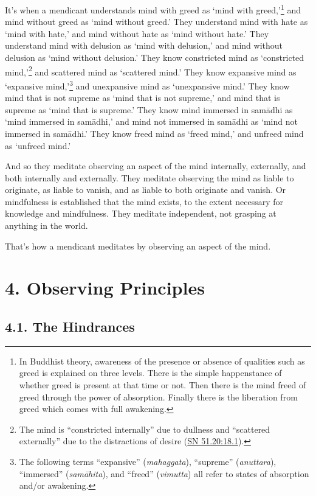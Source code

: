 \documentclass[12pt,openany]{book}%
\begin{document}
It’s when a mendicant understands mind with greed as ‘mind with greed,’\footnote{In Buddhist theory, awareness of the presence or absence of qualities such as greed is explained on three levels. There is the simple happenstance of whether greed is present at that time or not. Then there is the mind freed of greed through the power of absorption. Finally there is the liberation from greed which comes with full awakening. } and mind without greed as ‘mind without greed.’ They understand mind with hate as ‘mind with hate,’ and mind without hate as ‘mind without hate.’ They understand mind with delusion as ‘mind with delusion,’ and mind without delusion as ‘mind without delusion.’ They know constricted mind as ‘constricted mind,’\footnote{The mind is “constricted internally” due to dullness and “scattered externally” due to the distractions of desire (\href{https://suttacentral.net/sn51.20/en/sujato\#18.1}{SN 51.20:18.1}). } and scattered mind as ‘scattered mind.’ They know expansive mind as ‘expansive mind,’\footnote{The following terms “expansive” (\textit{mahaggata}), “supreme” (\textit{anuttara}), “immersed” (\textit{\textsanskrit{samāhita}}), and “freed” (\textit{vimutta}) all refer to states of absorption and/or awakening. } and unexpansive mind as ‘unexpansive mind.’ They know mind that is not supreme as ‘mind that is not supreme,’ and mind that is supreme as ‘mind that is supreme.’ They know mind immersed in \textsanskrit{samādhi} as ‘mind immersed in \textsanskrit{samādhi},’ and mind not immersed in \textsanskrit{samādhi} as ‘mind not immersed in \textsanskrit{samādhi}.’ They know freed mind as ‘freed mind,’ and unfreed mind as ‘unfreed mind.’ 

And so they meditate observing an aspect of the mind internally, externally, and both internally and externally. They meditate observing the mind as liable to originate, as liable to vanish, and as liable to both originate and vanish. Or mindfulness is established that the mind exists, to the extent necessary for knowledge and mindfulness. They meditate independent, not grasping at anything in the world. 

That’s how a mendicant meditates by observing an aspect of the mind. 

\section*{4. Observing Principles }

\subsection*{4.1. The Hindrances }
\end{document}
